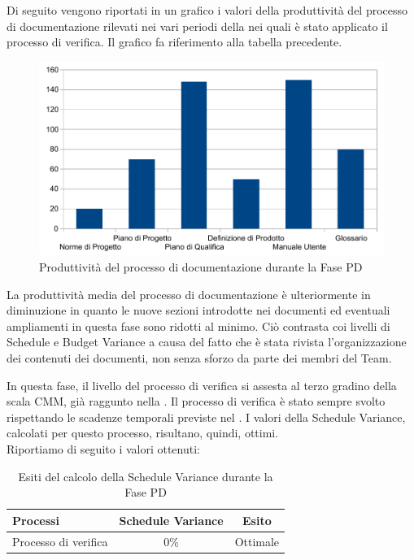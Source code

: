 			
			Di seguito vengono riportati in un grafico i valori della produttività del processo di documentazione rilevati nei vari periodi della  nei quali è stato applicato il processo di verifica. Il grafico fa riferimento alla tabella precedente.\\

			\begin{figure}[H]
				\centering
					\includegraphics[width=12cm]{PianoDiQualifica/Pics/ProduttivitaDocumentazioneFasePD.pdf}
				\caption{Produttività del processo di documentazione durante la Fase PD}
			\end{figure}

			La produttività media del processo di documentazione è ulteriormente in diminuzione in quanto le nuove sezioni introdotte nei documenti ed eventuali ampliamenti in questa fase sono ridotti al minimo. Ciò contrasta coi livelli di Schedule e Budget Variance a causa del fatto che è stata rivista l'organizzazione dei contenuti dei documenti, non senza sforzo da parte dei membri del Team.

			In questa fase, il livello del processo di verifica si assesta al terzo gradino della scala CMM, già raggunto nella .
			Il processo di verifica è stato sempre svolto rispettando le scadenze temporali previste nel . I valori della Schedule Variance, calcolati per questo processo, risultano, quindi, ottimi.\\
			Riportiamo di seguito i valori ottenuti:
			\begin{table}[H]
				\centering
				\begin{tabu}{| l | c | c |}
					\hline
						Processi 			& Schedule Variance	& Esito		\\ \hline \hline
						Processo di verifica & 0\% & Ottimale \\ \hline
				\end{tabu}
				\caption{Esiti del calcolo della Schedule Variance durante la Fase PD}
			\end{table}	

